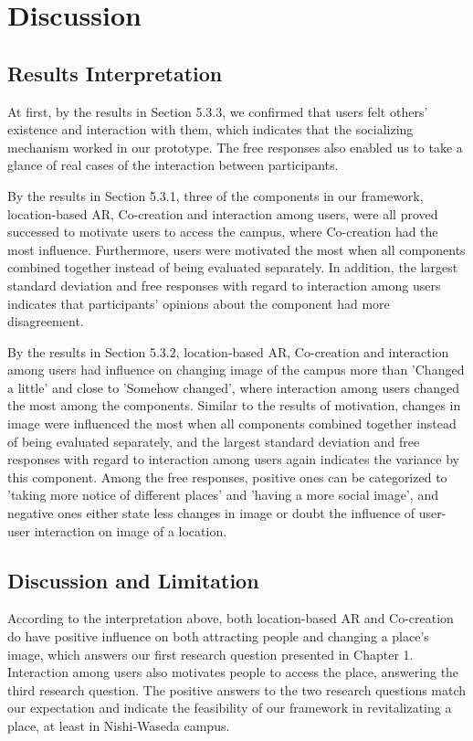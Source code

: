 \chapter{Discussion}\label{ch:6}

\section{Results Interpretation}

At first, by the results in Section 5.3.3, we confirmed that users felt others' existence and interaction with them, which indicates that the socializing mechanism worked in our prototype.
The free responses also enabled us to take a glance of real cases of the interaction between participants.

By the results in Section 5.3.1, three of the components in our framework, location-based AR, Co-creation and interaction among users, were all proved successed to motivate users to access the campus, where Co-creation had the most influence.
Furthermore, users were motivated the most when all components combined together instead of being evaluated separately.
In addition, the largest standard deviation and free responses with regard to interaction among users indicates that participants' opinions about the component had more disagreement.

By the results in Section 5.3.2, location-based AR, Co-creation and interaction among users had influence on changing image of the campus more than 'Changed a little' and close to 'Somehow changed',
where interaction among users changed the most among the components.
Similar to the results of motivation, changes in image were influenced the most when all components combined together instead of being evaluated separately,
and the largest standard deviation and free responses with regard to interaction among users again indicates the variance by this component.
Among the free responses, positive ones can be categorized to 'taking more notice of different places' and 'having a more social image',
and negative ones either state less changes in image or doubt the influence of user-user interaction on image of a location.

\section{Discussion and Limitation}

According to the interpretation above, both location-based AR and Co-creation do have positive influence on both attracting people and changing a place's image, which answers our first research question presented in Chapter 1.
Interaction among users also motivates people to access the place, answering the third research question.
The positive answers to the two research questions match our expectation and indicate the feasibility of our framework in revitalizating a place, at least in Nishi-Waseda campus.

